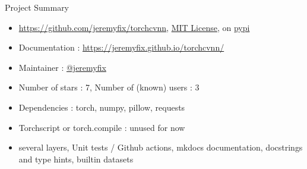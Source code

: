 \documentclass[aspectratio=169,10pt]{beamer}
\newcommand{\cmark}{%
\tikz[scale=0.23, color=green] {
    \draw[line width=0.7,line cap=round] (0.25,0) to [bend left=10] (1,1);
    \draw[line width=0.8,line cap=round] (0,0.35) to [bend right=1] (0.23,0);
}}
\newcommand{\greencheck}{}%
\DeclareRobustCommand{\greencheck}{%
  \cmark
}
\begin{document}
\begin{frame}{Project Summary}

\begin{itemize}
\item \href{https://github.com/jeremyfix/torchcvnn}{https://github.com/jeremyfix/torchcvnn}, \href{https://github.com/jeremyfix/torchcvnn/blob/main/LICENSE}{MIT License}, on \href{https://pypi.org/project/torchcvnn/}{pypi}
\item Documentation : \href{https://jeremyfix.github.io/torchcvnn/}{https://jeremyfix.github.io/torchcvnn/}
\item Maintainer : \href{https://github.com/jeremyfix}{@jeremyfix}
\item Number of stars : 7, Number of (known) users : 3
\item Dependencies : torch, numpy, pillow, requests
\item Torchscript or torch.compile : unused for now
\item \greencheck several layers, \greencheck Unit tests / Github actions, \greencheck mkdocs documentation, \greencheck docstrings and type hints, \greencheck builtin datasets


\end{itemize}
\end{frame}
\end{document}
